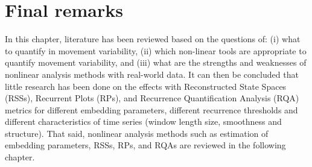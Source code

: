 \section{Final remarks}
In this chapter, literature has been reviewed based on the questions of:
(i) what to quantify in movement variability, 
(ii) which non-linear tools are appropriate to quantify 
movement variability, and 
(iii) what are the strengths and weaknesses of 
nonlinear analysis methods with real-world data.
It can then be concluded that little research has been done 
on the effects with Reconstructed State Spaces (RSSs), Recurrent Plots (RPs), 
and Recurrence Quantification Analysis (RQA) metrics for different 
embedding parameters, different recurrence thresholds and different 
characteristics of time series (window length size, smoothness and structure).
That said, nonlinear analysis methods such as estimation of 
embedding parameters, RSSs, RPs, and RQAs are 
reviewed in the following chapter.

